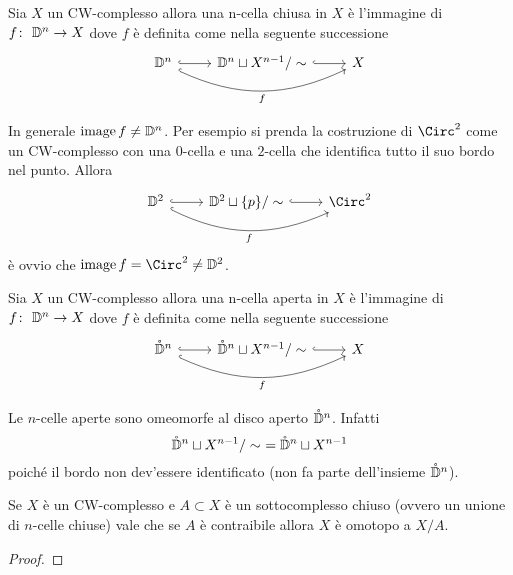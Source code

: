 \begin{definition}
	Sia $X$ un CW-complesso allora una n-cella chiusa in $X$ è l'immagine di $f \colon\ \mathbb{D}^n \rightarrow X$ dove $f$ è definita come nella seguente successione
	\begin{equation}
	\begin{tikzcd}
		\D^n \arrow[bend right=25, swap, hook]{rr}{f} \arrow[r,hook] & \D^n \sqcup X^{n-1} / \sim \arrow[r,hook] & X
	\end{tikzcd}
	\end{equation}
\end{definition}

\begin{remark}
	In generale $\operatorname{image}{f} \neq \mathbb{D}^n$. Per esempio si prenda la costruzione di $\Circ^2$ come un CW-complesso con una $0$-cella e una $2$-cella che identifica tutto il suo bordo nel punto. Allora 
	\begin{equation}
	\begin{tikzcd}
		\D^2 \arrow[bend right=25, swap, hook]{rr}{f} \arrow[r,hook] & \D^2 \sqcup \{p\} / \sim \arrow[r,hook] & \Circ^2
	\end{tikzcd}
	\end{equation}
	è ovvio che $\image{f} = \Circ^2 \neq \D^2$. 
\end{remark}

\begin{definition}
	Sia $X$ un CW-complesso allora una n-cella aperta in $X$ è l'immagine di $f \colon\ \mathbb{D}^n \rightarrow X$ dove $f$ è definita come nella seguente successione
	\begin{equation}
	\begin{tikzcd}
	\mathring{\D}^n \arrow[bend right=25, swap, hook]{rr}{f} \arrow[r,hook] & \mathring{\D}^n \sqcup X^{n-1} / \sim \arrow[r,hook] & X
	\end{tikzcd}
	\end{equation}
\end{definition}

\begin{remark}
	Le $n$-celle aperte sono omeomorfe al disco aperto $\mathring{\mathbb{D}}^n$. Infatti 
	\begin{equation}
		\mathring{\mathbb{D}}^n \sqcup X^{n-1} / \sim\ = \mathring{\mathbb{D}}^n \sqcup X^{n-1}
	\end{equation}
	poiché il bordo non dev'essere identificato (non fa parte dell'insieme $\mathring{\mathbb{D}}^n$).
\end{remark}

\begin{theorem}
	\label{thr:contrai_ncelle_cw_complesso}
	Se $X$ è un CW-complesso e $A \subset X$ è un sottocomplesso chiuso (ovvero un unione di $n$-celle chiuse) vale che se $A$ è contraibile allora $X$ è omotopo a $X / A$.
\end{theorem}
\begin{proof}
\end{proof}

